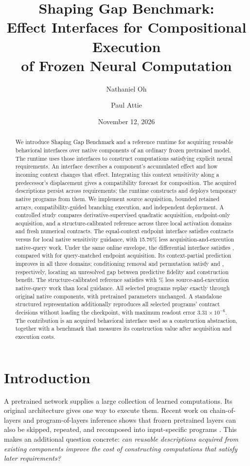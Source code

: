 \documentclass[11pt]{article}
\title{Shaping Gap Benchmark:\\Effect Interfaces for Compositional Execution\\of Frozen Neural Computation}
\author{Nathaniel Oh \and Paul Attie}
\date{November 12, 2026}
\begin{document}
\maketitle
\thispagestyle{plain}
\begin{abstract}
We introduce Shaping Gap Benchmark and a reference runtime for acquiring
reusable behavioral interfaces over native components of an ordinary frozen
pretrained model. The runtime uses those interfaces to construct computations
satisfying explicit neural requirements. An interface describes a
component's accumulated effect and how incoming context changes that effect.
Integrating this context sensitivity along a predecessor's displacement gives
a compatibility forecast for composition. The acquired descriptions persist
across requirements; the runtime constructs and deploys temporary native
programs from them. We implement source acquisition, bounded retained arrays,
compatibility-guided branching execution, and independent deployment.
A controlled study compares derivative-supervised quadratic acquisition,
endpoint-only acquisition, and a structure-calibrated reference across three
local activation domains and \TestConditions{} fresh numerical contracts.
The equal-context endpoint interface satisfies \ValueFewSolved{} contracts
versus \NativeSolved{} for local native sensitivity guidance, with 15.76\% less
acquisition-and-execution native-query work. Under the same online envelope,
the differential interface satisfies \DifferentialSolved{}, compared with
\ValueMatchedSolved{} for query-matched endpoint acquisition. Its context-partial
prediction improves in all three domains; conditioning removal and permutation
satisfy \RemovedSolved{} and \CorruptSolved{}, respectively, locating an
unresolved gap between predictive fidelity and construction benefit.
The structure-calibrated reference satisfies
\StructuredSolved{} with \StructuredSaving{}\% less source-and-execution
native-query work than local guidance. All \NativeReplays{} selected programs
replay exactly through original native components, with pretrained parameters
unchanged. A standalone structured representation additionally reproduces all
selected programs' contract decisions without loading the checkpoint, with
maximum readout error $3.31\times10^{-6}$.
The contribution is an acquired behavioral interface used as a construction
abstraction, together with a benchmark that measures its construction value
after acquisition and execution costs.
\end{abstract}

\section{Introduction}
A pretrained network supplies a large collection of learned computations.
Its original architecture gives one way to execute them. Recent work on
chain-of-layers and program-of-layers inference shows that frozen pretrained
layers can also be skipped, repeated, and recomposed into input-specific
programs \citep{cola,polar}. This makes an additional question concrete:
\emph{can reusable descriptions acquired from existing components improve
the cost of constructing computations that satisfy later requirements?}
\end{document}
